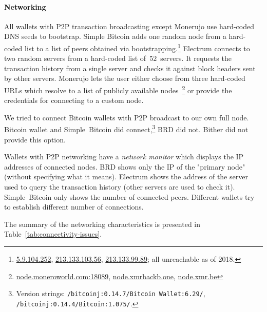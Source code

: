 \paragraph{Networking}
All wallets with P2P transaction broadcasting except Monerujo use hard-coded DNS seeds to bootstrap.
Simple Bitcoin adds one random node from a hard-coded list to a list of peers obtained via bootstrapping.\footnote{\url{5.9.104.252}, \url{213.133.103.56}, \url{213.133.99.89}; all unreachable as of 2018.}
Electrum connects to two random servers from a hard-coded list of~$52$~servers.
It requests the transaction history from a single server and checks it against block headers sent by other servers.
Monerujo lets the user either choose from three hard-coded URLs which resolve to a list of publicly available nodes~\footnote{\url{node.moneroworld.com:18089}, \url{node.xmrbackb.one}, \url{node.xmr.be}} or provide the credentials for connecting to a custom node.

We tried to connect Bitcoin wallets with P2P broadcast to our own full node.
Bitcoin wallet and Simple~Bitcoin did connect,\footnote{Version strings: \texttt{/bitcoinj:0.14.7/Bitcoin Wallet:6.29/}, \texttt{/bitcoinj:0.14.4/Bitcoin:1.075/}.} BRD did not.
Bither did not provide this option.

Wallets with P2P networking have a \textit{network monitor} which displays the IP addresses of connected nodes.
BRD shows only the IP of the "primary node" (without specifying what it means).
Electrum shows the address of the server used to query the transaction history (other servers are used to check it).
Simple~Bitcoin only shows the number of connected peers.
Different wallets try to establish different number of connections.

The summary of the networking characteristics is presented in Table~\ref{tab:connectivity-issues}.

